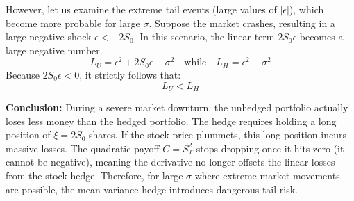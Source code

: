 However, let us examine the extreme tail events (large values of $|\epsilon|$), which become more probable for large $\sigma$. 
Suppose the market crashes, resulting in a large negative shock $\epsilon < -2S_0$. 
In this scenario, the linear term $2S_0\epsilon$ becomes a large negative number.
\begin{equation*}
L_U = \epsilon^2 + 2S_0\epsilon - \sigma^2 \quad \text{while} \quad L_H = \epsilon^2 - \sigma^2
\end{equation*}
Because $2S_0\epsilon < 0$, it strictly follows that:
\begin{equation*}
L_U < L_H
\end{equation*}

\textbf{Conclusion:} 
During a severe market downturn, the unhedged portfolio actually loses less money than the hedged portfolio. The hedge requires holding a long position of $\xi = 2S_0$ shares. If the stock price plummets, this long position incurs massive losses. The quadratic payoff $C=S_T^2$ stops dropping once it hits zero (it cannot be negative), meaning the derivative no longer offsets the linear losses from the stock hedge. Therefore, for large $\sigma$ where extreme market movements are possible, the mean-variance hedge introduces dangerous tail risk.